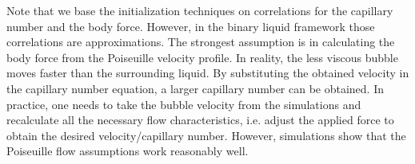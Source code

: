 \documentclass[preprint,12pt]{elsarticle}
\begin{document}

Note that we base the initialization techniques on correlations for the
capillary number and the body force. However, in the binary liquid framework
those correlations are approximations. The strongest assumption is
in calculating the body force from the Poiseuille velocity profile.
In reality, the less viscous bubble moves faster than the surrounding liquid. By
substituting the obtained velocity in the capillary number equation, a
larger capillary number can be obtained. In practice, one needs to take the bubble velocity from the
simulations and
recalculate all the necessary flow characteristics, i.e. adjust the
 applied force to obtain the desired velocity/capillary number. However, simulations show that the
Poiseuille flow assumptions work reasonably well.
\end{document}
